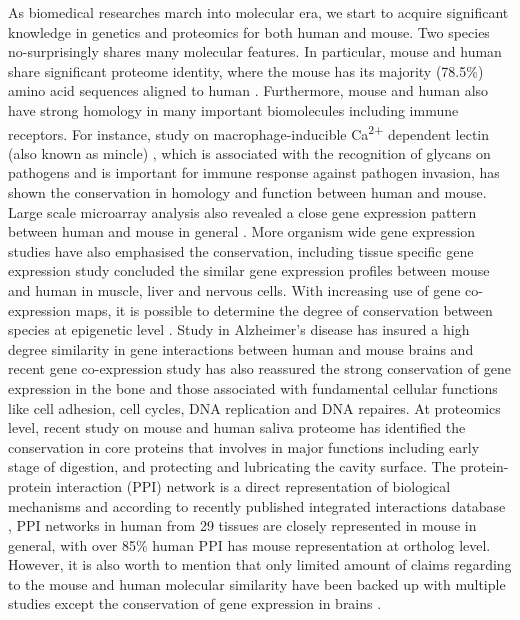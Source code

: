 As biomedical researches march into molecular era, we start to acquire significant knowledge in genetics and proteomics for both human and mouse. Two species no-surprisingly shares many molecular features. In particular, mouse and human share significant proteome identity, where the mouse has its majority (78.5\%) amino acid sequences aligned to human \cite{Lindblad_Toh_2001}. Furthermore, mouse and human also have strong homology in many important biomolecules including immune receptors. For instance, study on macrophage-inducible Ca\textsuperscript{2+} dependent lectin (also known as mincle) \cite{Rambaruth_2015}, which is associated with the recognition of glycans on pathogens \cite{Ishikawa_2009, 18490740, Yamasaki_2009} and is important for immune response against pathogen invasion, has shown the conservation in homology and function between human and mouse. Large scale microarray analysis also revealed a close gene expression pattern between human and mouse in general \cite{Liao_2005}. More organism wide gene expression studies have also emphasised the conservation, including tissue specific gene expression study \cite{Zheng_Bradley_2010} concluded the similar gene expression profiles between mouse and human in muscle, liver and nervous cells. With increasing use of gene co-expression maps, it is possible to determine the degree of conservation between species at epigenetic level \cite{Stuart_2003,Oldham_2006}. Study in Alzheimer's disease \cite{Miller_2010} has insured a high degree similarity in gene interactions between human and mouse brains and recent gene co-expression study \cite{Monaco_2015} has also reassured the strong conservation of gene expression in the bone and those associated with fundamental cellular functions like cell adhesion, cell cycles, DNA replication and DNA repaires. \cite{Monaco_2015} At proteomics level, recent study on mouse and human saliva proteome \cite{Karn_2013} has identified the conservation in core proteins that involves in major functions including early stage of digestion, and protecting and lubricating the cavity surface. The protein-protein interaction (PPI) network is a direct representation of biological mechanisms and according to recently published integrated interactions database \cite{Kotlyar_2015}, PPI networks in human from 29 tissues are closely represented in mouse in general, with over 85\% human PPI has mouse representation at ortholog level. However, it is also worth to mention that only limited amount of claims regarding to the mouse and human molecular similarity have been backed up with multiple studies except the conservation of gene expression in brains \cite{Liao_2005, Voolstra_2006, Miller_2010, Chan_2009}. 
\\


